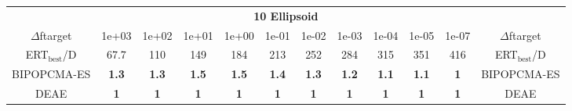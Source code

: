 \begin{tabular}{cccccccccccc}
 & \multicolumn{10}{c}{{\normalsize \textbf{10 Ellipsoid}}}\\
$\Delta$ftarget& 1e+03& 1e+02& 1e+01& 1e+00& 1e-01& 1e-02& 1e-03& 1e-04& 1e-05& 1e-07 & $\Delta$ftarget \\
ERT$_{\textrm{best}}$/D& 67.7& 110& 149& 184& 213& 252& 284& 315& 351& 416 & ERT$_{\textrm{best}}$/D \\
\hline
BIPOPCMA-ES & \textbf{1.3} & \textbf{1.3} & \textbf{1.5} & \textbf{1.5} & \textbf{1.4} & \textbf{1.3} & \textbf{1.2} & \textbf{1.1} & \textbf{1.1} & \textbf{1} & BIPOPCMA-ES \cite{add_an_entry_for_BIPOPCMA-ES_in_bbob.bib}\\
DEAE & \textbf{1} & \textbf{1} & \textbf{1} & \textbf{1} & \textbf{1} & \textbf{1} & \textbf{1} & \textbf{1} & \textbf{1} & \textbf{1} & DEAE \cite{add_an_entry_for_DEAE_in_bbob.bib}
\end{tabular}
